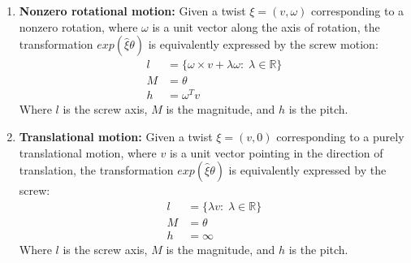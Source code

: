 \documentclass[oneside]{book}
\begin{document}
\begin{enumerate}
    \item \textbf{Nonzero rotational motion:} Given a twist $\xi = (v, \omega)$ corresponding to a nonzero rotation, where $\omega$ is a unit vector along the axis of rotation, the transformation $exp(\hat\xi\theta)$ is equivalently expressed by the screw motion:
    \begin{align}
        l &= \{\omega \times v + \lambda \omega:\; \lambda \in \mathbb{R}\}\\
        M &= \theta\\
        h &= \omega^T v
    \end{align}
    Where $l$ is the screw axis, $M$ is the magnitude, and $h$ is the pitch.
    
    \item \textbf{Translational motion:} Given a twist $\xi = (v, 0)$ corresponding to a purely translational motion, where $v$ is a unit vector pointing in the direction of translation, the transformation $exp(\hat\xi\theta)$ is equivalently expressed by the screw:
    \begin{align}
        l &= \{ \lambda v:\; \lambda \in \mathbb{R} \}\\
        M &= \theta\\
        h &= \infty
    \end{align}
    Where $l$ is the screw axis, $M$ is the magnitude, and $h$ is the pitch.
\end{enumerate}
\end{document}
